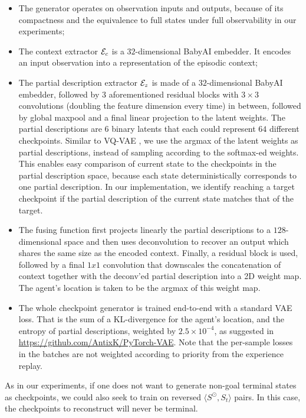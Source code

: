\begin{itemize}[leftmargin=*]
\item The generator operates on observation inputs and outputs, because of its compactness and the equivalence to full states under full observability in our experiments;
\item The context extractor $\mathcal{E}_c$ is a $32$-dimensional BabyAI embedder. It encodes an input observation into a representation of the episodic context;
\item The partial description extractor $\mathcal{E}_z$ is made of a $32$-dimensional BabyAI embedder, followed by $3$ aforementioned residual blocks with $3\times3$ convolutions (doubling the feature dimension every time) in between, followed by global maxpool and a final linear projection to the latent weights. The partial descriptions are $6$ binary latents that each could represent $64$ different checkpoints. Similar to VQ-VAE \citep{van2017neural}, we use the argmax of the latent weights as partial descriptions, instead of sampling according to the softmax-ed weights. This enables easy comparison of current state to the checkpoints in the partial description space, because each state deterministically corresponds to one partial description. In our implementation, we identify reaching a target checkpoint if the partial description of the current state matches that of the target.

\item The fusing function first projects linearly the partial descriptions to a $128$-dimensional space and then uses deconvolution to recover an output which shares the same size as the encoded context. Finally, a residual block is used, followed by a final $1x1$ convolution that downscales the concatenation of context together with the deconv'ed partial description into a 2D weight map. The agent's location is taken to be the argmax of this weight map.
\item The whole checkpoint generator is trained end-to-end with a standard VAE loss. That is the sum of a KL-divergence for the agent's location, and the entropy of partial descriptions, weighted by $2.5 \times 10^{-4}$, as suggested in \url{https://github.com/AntixK/PyTorch-VAE}. Note that the per-sample losses in the batches are not weighted according to priority from the experience replay.
\end{itemize}

As in our experiments, if one does not want to generate non-goal terminal states as checkpoints, we could also seek to train on reversed $\langle S^\odot, S_t \rangle$ pairs. In this case, the checkpoints to reconstruct will never be terminal.

